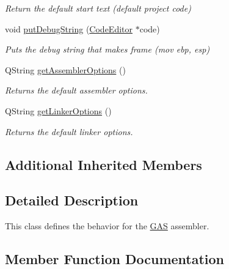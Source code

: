 \begin{DoxyCompactItemize}
\begin{DoxyCompactList}\small\item\em Return the default start text (default project code) \end{DoxyCompactList}\item 
\hypertarget{class_g_a_s_ae5477b2cccdb69b665be5d183d6b7086}{}void \hyperlink{class_g_a_s_ae5477b2cccdb69b665be5d183d6b7086}{put\+Debug\+String} (\hyperlink{class_code_editor}{Code\+Editor} $\ast$code)\label{class_g_a_s_ae5477b2cccdb69b665be5d183d6b7086}

\begin{DoxyCompactList}\small\item\em Puts the debug string that makes frame (mov ebp, esp) \end{DoxyCompactList}\item 
\hypertarget{class_g_a_s_af74e0b595c4ac405ba75895f7aadeb66}{}Q\+String \hyperlink{class_g_a_s_af74e0b595c4ac405ba75895f7aadeb66}{get\+Assembler\+Options} ()\label{class_g_a_s_af74e0b595c4ac405ba75895f7aadeb66}

\begin{DoxyCompactList}\small\item\em Returns the default assembler options. \end{DoxyCompactList}\item 
\hypertarget{class_g_a_s_a127305521d703d7cca95a087a220d9f0}{}Q\+String \hyperlink{class_g_a_s_a127305521d703d7cca95a087a220d9f0}{get\+Linker\+Options} ()\label{class_g_a_s_a127305521d703d7cca95a087a220d9f0}

\begin{DoxyCompactList}\small\item\em Returns the default linker options. \end{DoxyCompactList}\end{DoxyCompactItemize}
\subsection*{Additional Inherited Members}


\subsection{Detailed Description}
This class defines the behavior for the \hyperlink{class_g_a_s}{G\+A\+S} assembler. 



\subsection{Member Function Documentation}
\hypertarget{class_g_a_s_ab1d4e22ffd3a438afa4dad4025ab2735}{}
